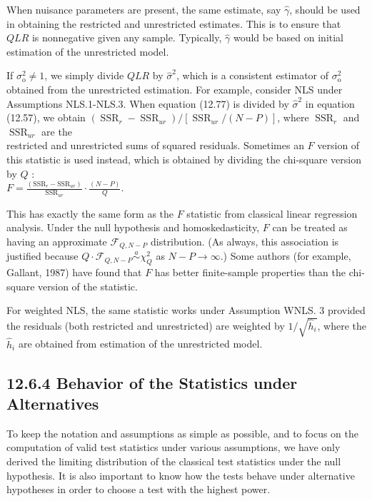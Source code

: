 \documentclass[10pt]{article}
\begin{document}
When nuisance parameters are present, the same estimate, say $\hat{\gamma}$, should be used in obtaining the restricted and unrestricted estimates. This is to ensure that $Q L R$ is nonnegative given any sample. Typically, $\hat{\gamma}$ would be based on initial estimation of the unrestricted model.

If $\sigma_{\mathrm{o}}^{2} \neq 1$, we simply divide $Q L R$ by $\hat{\sigma}^{2}$, which is a consistent estimator of $\sigma_{\mathrm{o}}^{2}$ obtained from the unrestricted estimation. For example, consider NLS under Assumptions NLS.1-NLS.3. When equation (12.77) is divided by $\hat{\sigma}^{2}$ in equation (12.57), we obtain $\left(\operatorname{SSR}_{r}-\operatorname{SSR}_{u r}\right) /\left[\operatorname{SSR}_{u r} /(N-P)\right]$, where $\operatorname{SSR}_{r}$ and $\operatorname{SSR}_{u r}$ are the\\
restricted and unrestricted sums of squared residuals. Sometimes an $F$ version of this statistic is used instead, which is obtained by dividing the chi-square version by $Q$ :\\
$F=\frac{\left(\mathrm{SSR}_{r}-\mathrm{SSR}_{u r}\right)}{\mathrm{SSR}_{u r}} \cdot \frac{(N-P)}{Q}$.

This has exactly the same form as the $F$ statistic from classical linear regression analysis. Under the null hypothesis and homoskedasticity, $F$ can be treated as having an approximate $\mathscr{F}_{Q, N-P}$ distribution. (As always, this association is justified because $Q \cdot \mathscr{F}_{Q, N-P} \stackrel{a}{\sim} \chi_{Q}^{2}$ as $N-P \rightarrow \infty$.) Some authors (for example, Gallant, 1987) have found that $F$ has better finite-sample properties than the chi-square version of the statistic.

For weighted NLS, the same statistic works under Assumption WNLS. 3 provided the residuals (both restricted and unrestricted) are weighted by $1 / \sqrt{\hat{h}_{i}}$, where the $\hat{h}_{i}$ are obtained from estimation of the unrestricted model.

\subsection*{12.6.4 Behavior of the Statistics under Alternatives}
To keep the notation and assumptions as simple as possible, and to focus on the computation of valid test statistics under various assumptions, we have only derived the limiting distribution of the classical test statistics under the null hypothesis. It is also important to know how the tests behave under alternative hypotheses in order to choose a test with the highest power.
\end{document}
